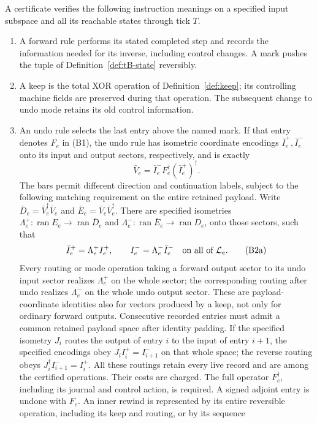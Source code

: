 \begin{definition}
A certificate verifies the following instruction meanings on a specified
input subspace and all its reachable states through tick $T$.
\begin{enumerate}
\item A forward rule performs its stated completed step and records the
information needed for its inverse, including control changes. A mark
pushes the tuple of Definition~\ref{def:tB-state} reversibly.
\item A keep is the total XOR operation of Definition~\ref{def:keep};
its controlling machine fields are preserved during that operation.
The subsequent change to undo mode retains its old control information.
\item An undo rule selects the last entry above the named mark. If that
entry denotes $F_e$ in (B1), the undo rule has isometric coordinate
encodings $\bar I_e^+,\bar I_e^-$ onto its input and output sectors,
respectively, and is exactly
\[
 \bar V_e=\bar I_e^- F_e^\dagger(\bar I_e^+)^\dagger.          \tag{B2}
\]
The bars permit different direction and continuation labels, subject to
the following matching requirement on the entire retained payload.
Write $\bar D_e=\bar V_e^\dagger\bar V_e$ and
$\bar E_e=\bar V_e\bar V_e^\dagger$. There are specified isometries
$\Lambda_e^+:\operatorname{ran}E_e\to\operatorname{ran}\bar D_e$
and $\Lambda_e^-:\operatorname{ran}\bar E_e\to\operatorname{ran}D_e$,
onto those sectors, such that
\[
 \bar I_e^+=\Lambda_e^+ I_e^+,
 \qquad I_e^-=\Lambda_e^-\bar I_e^-
 \quad\hbox{on all of }\mathcal L_e.                 \tag{B2a}
\]
Every routing or mode operation taking a forward output sector to its
undo input sector realizes $\Lambda_e^+$ on the whole sector; the
corresponding routing after undo realizes $\Lambda_e^-$ on the whole
undo output sector. These are payload-coordinate identities also for
vectors produced by a keep, not only for ordinary forward outputs.
Consecutive recorded entries must admit a common retained payload space
after identity padding. If the specified isometry $J_i$ routes the output of entry $i$ to
the input of entry $i+1$, the specified encodings obey
$J_i I_i^+=I_{i+1}^-$ on that whole space; the reverse routing obeys
$J_i^\dagger I_{i+1}^-=I_i^+$. All these routings retain every live
record and are among the certified operations. Their costs are charged.
The full operator $F_e^\dagger$,
including its journal and control action, is required. A signed adjoint
entry is undone with $F_e$. An inner rewind is represented by its entire
reversible operation, including its keep and routing, or by its sequence

\end{enumerate}
\end{definition}
